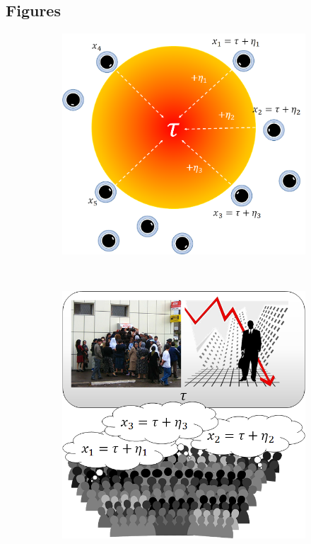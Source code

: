 \documentclass[12pt]{article}
\begin{document}
%

\newpage
\subsection*{Figures}
\begin{figure}[ht!]
    \centering\begin{subfigure}[t]{0.5\textwidth}
        \centering
        \includegraphics[width=1\textwidth]{figures/firefighting.png}
        \caption{}
    \end{subfigure}%
    ~ 
    \begin{subfigure}[t]{0.5\textwidth}
        \centering
        \includegraphics[width=1\textwidth]{figures/bankrun.png}

\end{subfigure}
\end{figure}
\end{document}
